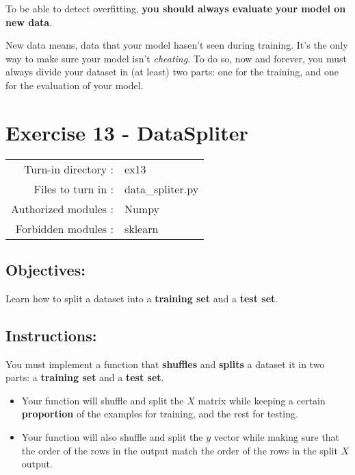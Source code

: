 \documentclass[]{article}
\begin{document}
To be able to detect overfitting, \textbf{you should always evaluate
your model on new data}.

New data means, data that your model hasen't seen during training. It's
the only way to make sure your model isn't \emph{cheating}. To do so,
now and forever, you must always divide your dataset in (at least) two
parts: one for the training, and one for the evaluation of your model.
\clearpage

\hypertarget{exercise-13---dataspliter-1}{%
\section{Exercise 13 - DataSpliter}\label{exercise-13---dataspliter-1}}

\begin{longtable}[]{@{}rl@{}}
\toprule
\endhead
Turn-in directory : & ex13\tabularnewline
Files to turn in : & data\_spliter.py\tabularnewline
Authorized modules : & Numpy\tabularnewline
Forbidden modules : & sklearn\tabularnewline
\bottomrule
\end{longtable}

\hypertarget{objectives-10}{%
\subsection{Objectives:}\label{objectives-10}}

Learn how to split a dataset into a \textbf{training set} and a
\textbf{test set}.

\hypertarget{instructions-13}{%
\subsection{Instructions:}\label{instructions-13}}

You must implement a function that \textbf{shuffles} and \textbf{splits}
a dataset it in two parts: a \textbf{training set} and a \textbf{test
set}.

\begin{itemize}
\item
  Your function will shuffle and split the \(X\) matrix while keeping a
  certain \textbf{proportion} of the examples for training, and the rest
  for testing.
\item
  Your function will also shuffle and split the \(y\) vector while
  making sure that the order of the rows in the output match the order
  of the rows in the split \(X\) output.
\end{itemize}
\end{document}
